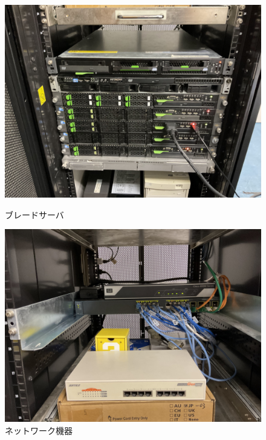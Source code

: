 \begin{figure}[tbh]
    \begin{minipage}[b]{0.45\columnwidth}
      \centering
      \includegraphics[width=\columnwidth]{./image/02-AboutSysken/server.jpg}
      \caption{ブレードサーバ}
    \end{minipage}
    \hspace{0.04\columnwidth}
    \begin{minipage}[b]{0.45\columnwidth}
      \centering
      \includegraphics[width=\columnwidth]{./image/02-AboutSysken/network.jpg}
      \caption{ネットワーク機器}
    \end{minipage}
\end{figure}

